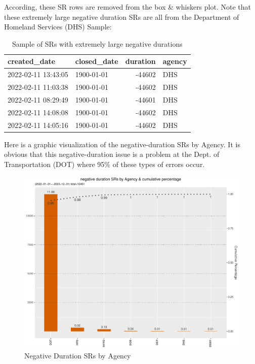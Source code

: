 \documentclass[12pt, titlepage]{article}
\begin{document}
{According, these  SR rows are removed from the box \& whiskers plot. 
Note that these extremely large negative duration SRs are all from the 
Department of Homeland Services (DHS) Sample: 

\begin{table}[tbp]
    \centering
     \normalsize
    \caption{Sample of SRs with extremely large negative durations}
    \begin{tabular}{l l r l}
        \toprule
        \textbf{created\_date} & \textbf{closed\_date} & \textbf{duration} 
        & \textbf{agency} \\
	        \midrule
	        2022-02-11 13:43:05 & 1900-01-01 & -44602 & DHS \\
	        2022-02-11 11:03:38 & 1900-01-01 & -44602 & DHS \\
	        2022-02-11 08:29:49 & 1900-01-01 & -44601 & DHS \\
	        2022-02-11 14:08:08 & 1900-01-01 & -44602 & DHS \\
	        2022-02-11 14:05:16 & 1900-01-01 & -44602 & DHS \\
	        \bottomrule
    \end{tabular}
    \label{tab:extreme_negative_durations}
\end{table}

Here is a graphic visualization of the negative-duration SRs by Agency. It is 
obvious that this negative-duration issue is a problem at the 
Dept. of Transportation (DOT) where 95\% of these types of errors occur. 

\begin{figure}[tbp]
 	 \centering
 	 \includegraphics[width = \textwidth]{negative_duration_SR_barchart.pdf}
	  \caption{Negative Duration SRs by Agency}
	  \label{fig:negative-duration}
\end{figure}

}
\end{document}
